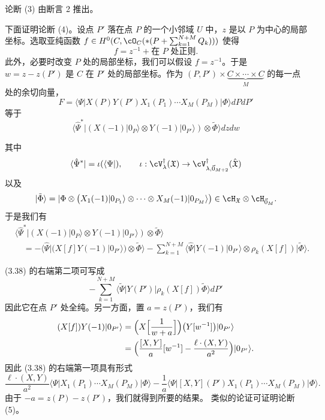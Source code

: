 论断 (3) 由断言 2 推出。

下面证明论断 (4)。设点 $P'$ 落在点 $P$ 的一个小邻域 $U$ 中，$z$ 是以 $P$
为中心的局部坐标。选取亚纯函数
$f\in H^0(C,\cO_C(*(P+\sum_{k=1}^{N+M}Q_k)))$ 使得
\[
  f = z^{-1} + \text{在 } P \text{ 处正则}.
\]
此外，必要时改变 $P$ 处的局部坐标，我们可以假设 $f=z^{-1}$。于是
$w=z-z(P')$ 是 $C$ 在 $P'$ 处的局部坐标。作为
$(P,P')\times\underbrace{C\times\cdots\times C}_{M}$ 的每一点处的余切向量，
\[
  F = \langle\Psi|X(P)Y(P')X_1(P_1)\cdots X_M(P_M)|\Phi\rangle dPdP'
\]
等于
\[
  \langle\hat{\Psi}^*|(X(-1)|0_P\rangle\otimes Y(-1)|0_{P'}\rangle)
  \otimes\tilde{\Phi}\rangle dzdw
\]

其中
\[
  \langle\hat{\Psi}^*| = \iota(\langle\Psi|),\qquad
  \iota : \cV_\lambda^\dagger(\mathfrak{X})
  \to \cV_{\lambda,\vec{0}_{M+2}}^\dagger(\hat{\mathfrak{X}})
\]
以及
\[
  |\tilde{\Phi}\rangle = |\Phi\otimes\bigl(X_1(-1)|0_{P_1}\rangle\otimes\cdots
  \otimes X_M(-1)|0_{P_M}\rangle\bigr)
  \in\cH_{\mathfrak{X}}\otimes\cH_{\vec{0}_M} .
\]
于是我们有
\begin{equation}
  \begin{aligned}
  &\langle\hat{\Psi}^*|(X(-1)|0_P\rangle\otimes Y(-1)|0_{P'}\rangle)
   \otimes\tilde{\Phi}\rangle\\
  &\quad = -\langle\hat{\Psi}|(X[f]Y(-1)|0_{P'}\rangle)\otimes\tilde{\Phi}\rangle
    -\sum_{k=1}^{N+M}\langle\hat{\Psi}|Y(-1)|0_{P'}\rangle
    \otimes\rho_k(X[f])|\tilde{\Phi}\rangle .
  \end{aligned} \tag{3.38}
\end{equation}

(3.38) 的右端第二项可写成
\[
  -\sum_{k=1}^{N+M}\langle\tilde{\Psi}|Y(P')|\rho_k(X[f])\tilde{\Phi}\rangle dP'
\]
因此它在点 $P'$ 处全纯。另一方面，置 $a=z(P')$，我们有
\[
  \begin{aligned}
  (X[f])Y(-1)|0_{P'}\rangle
  &= \Bigl(X\Bigl[\frac{1}{w+a}\Bigr]\Bigr)\bigl(Y[w^{-1}]\bigr)|0_{P'}\rangle\\
  &= \Bigl(\frac{[X,Y]}{a}[w^{-1}]
     -\frac{\ell\cdot(X,Y)}{a^2}\Bigr)|0_{P'}\rangle .
  \end{aligned}
\]
因此 (3.38) 的右端第一项具有形式
\[
  \frac{\ell\cdot(X,Y)}{a^2}\langle\Psi|X_1(P_1)\cdots X_M(P_M)|\Phi\rangle
  -\frac{1}{a}\langle\Psi|[X,Y](P')X_1(P_1)\cdots X_M(P_M)|\Phi\rangle .
\]
由于 $-a=z(P)-z(P')$，我们就得到所要的结果。
类似的论证可证明论断 (5)。

